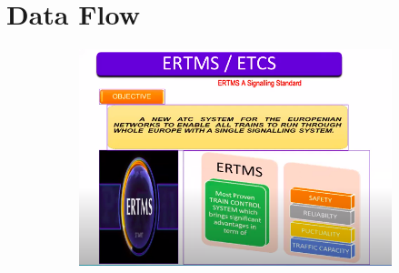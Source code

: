 \documentclass{beamer}
\begin{document}
\section{Data Flow}
\begin{frame}

\begin{figure}[h!]
  \centering
  \begin{subfigure}[b]{1\linewidth}
    \includegraphics[width=\linewidth]{./figs/KAVACH6.png}
  \end{subfigure}

\end{figure}

\end{frame}
\end{document}
